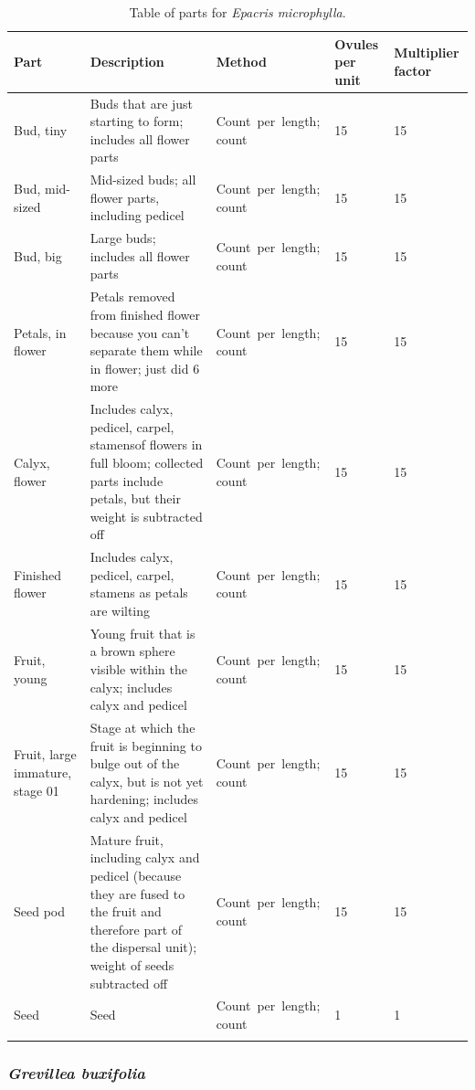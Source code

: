 \documentclass[10pt,twoside]{article}\usepackage[]{graphicx}\usepackage[]{color}
\begin{document}
\clearpage
\begingroup\small
\begin{longtable}{p{4.5cm}p{6cm}p{2cm}p{1cm}p{1cm}}
\caption{Table of parts for \emph{Epacris microphylla}.} \\ 
  \hline
Part & Description & Method & Ovules per unit & Multiplier factor \\ 
  \hline
Bud, tiny & Buds that are just starting to form; includes all flower parts & Count\ per\ length; count & 15 &  15 \\ 
  Bud, mid-sized & Mid-sized buds; all flower parts, including pedicel & Count\ per\ length; count & 15 &  15 \\ 
  Bud, big & Large buds; includes all flower parts & Count\ per\ length; count & 15 &  15 \\ 
  Petals, in flower & Petals removed from finished flower because you can't separate them while in flower; just did 6 more & Count\ per\ length; count & 15 &  15 \\ 
  Calyx, flower & Includes calyx, pedicel, carpel, stamensof flowers in full bloom; collected parts include petals, but their weight is subtracted off & Count\ per\ length; count & 15 &  15 \\ 
  Finished flower & Includes calyx, pedicel, carpel, stamens as petals are wilting & Count\ per\ length; count & 15 &  15 \\ 
  Fruit, young & Young fruit that is a brown sphere visible within the calyx; includes calyx and pedicel & Count\ per\ length; count & 15 &  15 \\ 
  Fruit, large immature, stage 01 & Stage at which the fruit is beginning to bulge out of the calyx, but is not yet hardening; includes calyx and pedicel & Count\ per\ length; count & 15 &  15 \\ 
  Seed pod & Mature fruit, including calyx and pedicel (because they are fused to the fruit and therefore part of the dispersal unit); weight of seeds subtracted off & Count\ per\ length; count & 15 &  15 \\ 
  Seed & Seed & Count\ per\ length; count & 1 &   1 \\ 
   \hline
\hline
\label{tab:parts_Epacris_microphylla}
\end{longtable}
\endgroup


\clearpage

\subsubsection{\emph{Grevillea buxifolia}}
\end{document}
